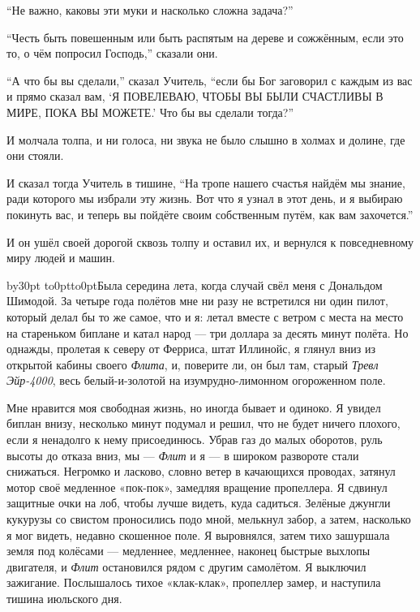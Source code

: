 ``Не важно, каковы эти муки и насколько сложна задача?''

``Честь быть повешенным или быть распятым на дереве и сожжённым, если это то, о чём попросил
 Господь,'' сказали они.

``А что бы вы сделали,'' сказал Учитель, ``если бы Бог заговорил с каждым из вас и прямо сказал вам, `Я ПОВЕЛЕВАЮ, ЧТОБЫ ВЫ БЫЛИ СЧАСТЛИВЫ В МИРЕ, ПОКА ВЫ МОЖЕТЕ.' Что бы вы сделали тогда?''

И молчала толпа, и ни голоса, ни звука не было слышно в холмах и долине, где они стояли.

И сказал тогда Учитель в тишине, ``На тропе нашего счастья найдём мы знание, ради которого мы
избрали эту жизнь. Вот что я узнал в этот день, и я выбираю покинуть вас, и теперь вы пойдёте
своим собственным путём, как вам захочется.''

И он ушёл своей дорогой сквозь толпу и оставил их, и вернулся к повседневному миру людей и машин.

\endgroup
\vfil\eject

{}
\vskip3cm

\begingroup{}
\def\par{\endgraf\endgroup}
\advance\parindent by30pt \hang{}
\noindent\vtop to0pt{\kern-8pt\hbox to0pt{\hss\kern\parindent\bukvfont Б\kern3pt}\vss}ыла середина
лета, когда случай свёл меня с Дональдом Шимодой.
За четыре года полётов мне ни разу не встретился ни один пилот, который делал бы то же самое, что
и я: летал вместе с ветром с места на место на стареньком биплане и катал народ --- три доллара
за десять минут полёта. Но однажды, пролетая к северу от Ферриса, штат Иллинойс, я глянул вниз из
открытой кабины своего {\it Флита}, и, поверите ли, он был там, старый {\it Тревл Эйр-4000}, весь
белый-и-золотой на изумрудно-лимонном огороженном поле.

Мне нравится моя свободная жизнь, но иногда бывает и одиноко. Я увидел биплан внизу, несколько
минут подумал и решил, что не будет ничего плохого, если я ненадолго к нему присоединюсь. Убрав
газ до малых оборотов, руль высоты до отказа вниз, мы --- {\it Флит\/} и я --- в широком развороте стали
снижаться. Негромко и ласково, словно ветер в качающихся проводах, затянул мотор своё медленное
«пок-пок», замедляя вращение пропеллера. Я сдвинул защитные очки на лоб, чтобы лучше видеть, куда
садиться. Зелёные джунгли кукурузы со свистом проносились подо мной, мелькнул забор, а затем,
насколько я мог видеть, недавно скошенное поле. Я выровнялся, затем тихо зашуршала земля под
колёсами --- медленнее, медленнее, наконец быстрые выхлопы двигателя, и {\it Флит\/} остановился
рядом с другим самолётом. Я выключил зажигание. Послышалось тихое «клак-клак», пропеллер замер, и наступила тишина июльского дня.

